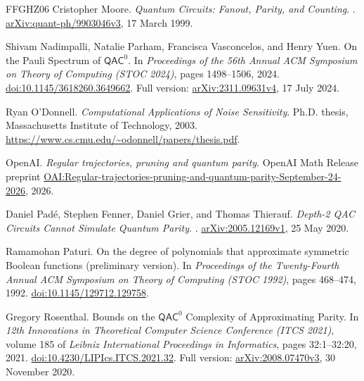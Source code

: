 \begin{thebibliography}{FFGHZ06}
Cristopher Moore.
\newblock \emph{Quantum Circuits: Fanout, Parity, and Counting}.
. \href{https://arxiv.org/abs/quant-ph/9903046v3}{arXiv:quant-ph/9903046v3},
17 March 1999.

Shivam Nadimpalli, Natalie Parham, Francisca Vasconcelos, and Henry Yuen.
\newblock On the Pauli Spectrum of $\mathsf{QAC}^{0}$.
\newblock In \emph{Proceedings of the 56th Annual ACM Symposium on Theory of
Computing (STOC 2024)}, pages 1498--1506, 2024.
\newblock \href{https://doi.org/10.1145/3618260.3649662}{doi:10.1145/3618260.3649662}.
Full version: \href{https://arxiv.org/abs/2311.09631v4}{arXiv:2311.09631v4},
17 July 2024.

Ryan O'Donnell.
\newblock \emph{Computational Applications of Noise Sensitivity}.
\newblock Ph.D. thesis, Massachusetts Institute of Technology, 2003.
\newblock \url{https://www.cs.cmu.edu/~odonnell/papers/thesis.pdf}.

OpenAI.
\newblock \emph{Regular trajectories, pruning and quantum parity}.
\newblock OpenAI Math Release preprint
\href{https://github.com/openai/math/blob/main/preprints/Regular-trajectories-pruning-and-quantum-parity-September-24-2026/paper.pdf}{OAI:Regular-trajectories-pruning-and-quantum-parity-September-24-2026}, 2026.

Daniel Pad\'e, Stephen Fenner, Daniel Grier, and Thomas Thierauf.
\newblock \emph{Depth-2 QAC Circuits Cannot Simulate Quantum Parity}.
. \href{https://arxiv.org/abs/2005.12169v1}{arXiv:2005.12169v1},
25 May 2020.

Ramamohan Paturi.
\newblock On the degree of polynomials that approximate symmetric Boolean
functions (preliminary version).
\newblock In \emph{Proceedings of the Twenty-Fourth Annual ACM Symposium
on Theory of Computing (STOC 1992)}, pages 468--474, 1992.
\newblock \href{https://doi.org/10.1145/129712.129758}{doi:10.1145/129712.129758}.

Gregory Rosenthal.
\newblock Bounds on the $\mathsf{QAC}^{0}$ Complexity of Approximating Parity.
\newblock In \emph{12th Innovations in Theoretical Computer Science Conference
(ITCS 2021)}, volume 185 of \emph{Leibniz International Proceedings in
Informatics}, pages 32:1--32:20, 2021.
\newblock \href{https://doi.org/10.4230/LIPIcs.ITCS.2021.32}{doi:10.4230/LIPIcs.ITCS.2021.32}.
Full version: \href{https://arxiv.org/abs/2008.07470v3}{arXiv:2008.07470v3},
30 November 2020.


\end{thebibliography}
